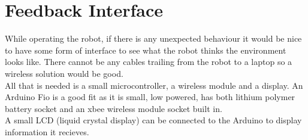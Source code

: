 \section{Feedback Interface}
While operating the robot, if there is any unexpected behaviour it would be nice to have some form of interface to see what the robot thinks the environment looks like.  There cannot be any cables trailing from the robot to a laptop so a wireless solution would be good.
\\All that is needed is a small microcontroller, a wireless module and a display.
An Arduino Fio is a good fit as it is small, low powered, has both lithium polymer battery socket and an xbee wireless module socket built in.
\\A small LCD (liquid crystal display) can be connected to the Arduino to display information it recieves.

